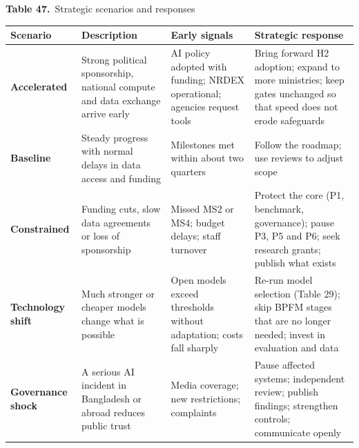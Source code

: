 \documentclass[border=10pt]{standalone}
\begin{document}
\begin{minipage}{17cm}
{\large\bfseries Table 47.}\ {\large Strategic scenarios and responses}\par\vspace{7pt}
\small
{}
\begin{tabularx}{\linewidth}{@{}>{\hsize=0.681\hsize\raggedright\arraybackslash}X>{\hsize=1.106\hsize\raggedright\arraybackslash}X>{\hsize=0.979\hsize\raggedright\arraybackslash}X>{\hsize=1.234\hsize\raggedright\arraybackslash}X@{}}
\arrayrulecolor{bapilrule}\toprule
\rowcolor{white}\textbf{Scenario} & \textbf{Description} & \textbf{Early signals} & \textbf{Strategic response} \\
\midrule
\textbf{Accelerated} & Strong political sponsorship, national compute and data exchange arrive early & AI policy adopted with funding; NRDEX operational; agencies request tools & Bring forward H2 adoption; expand to more ministries; keep gates unchanged so that speed does not erode safeguards \\
\textbf{Baseline} & Steady progress with normal delays in data access and funding & Milestones met within about two quarters & Follow the roadmap; use reviews to adjust scope \\
\textbf{Constrained} & Funding cuts, slow data agreements or loss of sponsorship & Missed MS2 or MS4; budget delays; staff turnover & Protect the core (P1, benchmark, governance); pause P3, P5 and P6; seek research grants; publish what exists \\
\textbf{Technology shift} & Much stronger or cheaper models change what is possible & Open models exceed thresholds without adaptation; costs fall sharply & Re-run model selection (Table 29); skip BPFM stages that are no longer needed; invest in evaluation and data \\
\textbf{Governance shock} & A serious AI incident in Bangladesh or abroad reduces public trust & Media coverage; new restrictions; complaints & Pause affected systems; independent review; publish findings; strengthen controls; communicate openly \\
\bottomrule
\end{tabularx}
\par{}
\end{minipage}
\end{document}
